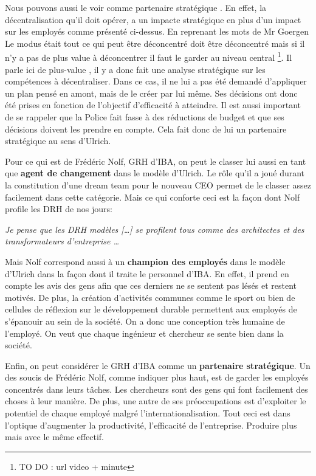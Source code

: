 Nous pouvons aussi le voir comme \og partenaire stratégique \fg{}. En effet, la décentralisation qu'il doit opérer, a un impacte stratégique en plus d'un impact sur les employés comme présenté ci-dessus. En reprenant les mots de Mr Goergen \og Le modus était tout ce qui peut être déconcentré doit être déconcentré mais si il n’y a pas de plus value à déconcentrer il faut le garder au niveau central \fg{} \footnote{TO DO : url video + minute}. Il parle ici de \og plus-value \fg{}, il y a donc fait une analyse stratégique sur les compétences à décentraliser. Dans ce cas, il ne lui a pas été demandé d'appliquer un plan pensé en amont, mais de le créer par lui même. Ses décisions ont donc été prises en fonction de l'objectif d'efficacité à atteindre. Il est aussi important de se rappeler que la Police fait fasse à des réductions de budget et que ses décisions doivent les prendre en compte. Cela fait donc de lui un \og partenaire stratégique \fg{} au sens d'Ulrich.\\   


Pour ce qui est de Frédéric Nolf, GRH d'IBA, on peut le classer lui aussi en tant que \textbf{agent de changement} dans le modèle d'Ulrich. Le rôle qu'il a joué durant la constitution d'une dream team pour le nouveau CEO permet de le classer assez facilement dans cette catégorie. Mais ce qui conforte ceci est la façon dont Nolf profile les DRH de nos jours:\newline

\og{} \textit{Je pense que les DRH modèles [\ldots] se profilent tous comme 
des architectes et des transformateurs d’entreprise \ldots} \fg{} \newline

Mais Nolf correspond aussi à un \textbf{champion des employés} dans le modèle d'Ulrich dans la façon dont il traite le personnel d'IBA. En effet, il prend en compte les avis des gens afin que ces derniers ne se sentent pas lésés et restent motivés. De plus, la création d'activités communes comme le sport ou bien de cellules de réflexion sur le développement durable permettent aux employés de s'épanouir au sein de la société. On a donc une conception très humaine de l'employé. On veut que chaque ingénieur et chercheur se sente bien dans la société. \newline

Enfin, on peut considérer le GRH d'IBA comme un \textbf{partenaire stratégique}. Un des soucis de Frédéric Nolf, comme indiquer plus haut, est de garder les employés concentrés dans leurs tâches. Les chercheurs sont des gens qui font facilement des choses à leur manière. De plus, une autre de ses préoccupations est d'exploiter le potentiel de chaque employé malgré l'internationalisation. Tout ceci est dans l'optique d'augmenter la productivité, l'efficacité de l'entreprise. Produire plus mais avec le même effectif. 



